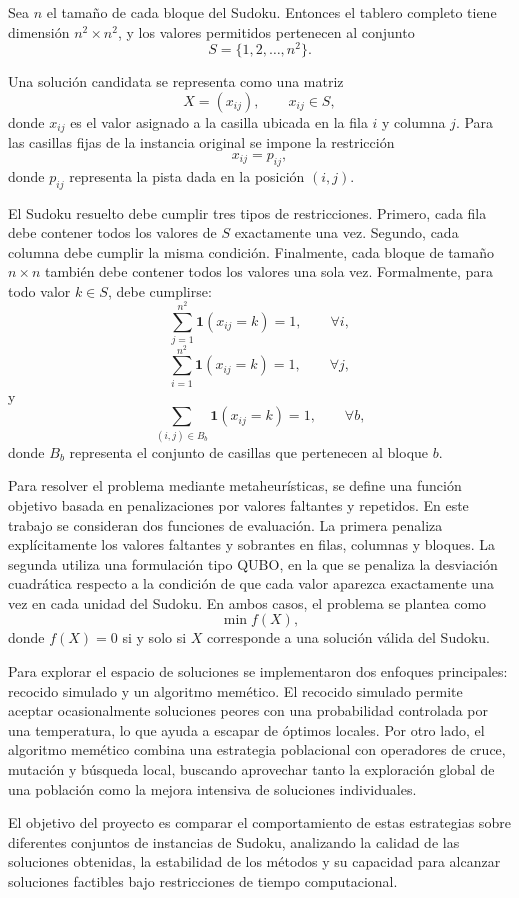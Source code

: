 \documentclass{article}
\begin{document}
Sea \(n\) el tamaño de cada bloque del Sudoku. Entonces el tablero completo tiene dimensión \(n^2 \times n^2\), y los valores permitidos pertenecen al conjunto
\[
S = \{1,2,\ldots,n^2\}.
\]

Una solución candidata se representa como una matriz
\[
X = (x_{ij}), \qquad x_{ij} \in S,
\]
donde \(x_{ij}\) es el valor asignado a la casilla ubicada en la fila \(i\) y columna \(j\). Para las casillas fijas de la instancia original se impone la restricción
\[
x_{ij} = p_{ij},
\]
donde \(p_{ij}\) representa la pista dada en la posición \((i,j)\).

El Sudoku resuelto debe cumplir tres tipos de restricciones. Primero, cada fila debe contener todos los valores de \(S\) exactamente una vez. Segundo, cada columna debe cumplir la misma condición. Finalmente, cada bloque de tamaño \(n \times n\) también debe contener todos los valores una sola vez. Formalmente, para todo valor \(k \in S\), debe cumplirse:
\[
\sum_{j=1}^{n^2} \mathbf{1}(x_{ij}=k) = 1, \qquad \forall i,
\]
\[
\sum_{i=1}^{n^2} \mathbf{1}(x_{ij}=k) = 1, \qquad \forall j,
\]
y
\[
\sum_{(i,j)\in B_b} \mathbf{1}(x_{ij}=k) = 1, \qquad \forall b,
\]
donde \(B_b\) representa el conjunto de casillas que pertenecen al bloque \(b\).

Para resolver el problema mediante metaheurísticas, se define una función objetivo basada en penalizaciones por valores faltantes y repetidos. En este trabajo se consideran dos funciones de evaluación. La primera penaliza explícitamente los valores faltantes y sobrantes en filas, columnas y bloques. La segunda utiliza una formulación tipo QUBO, en la que se penaliza la desviación cuadrática respecto a la condición de que cada valor aparezca exactamente una vez en cada unidad del Sudoku. En ambos casos, el problema se plantea como
\[
\min f(X),
\]
donde \(f(X)=0\) si y solo si \(X\) corresponde a una solución válida del Sudoku.

Para explorar el espacio de soluciones se implementaron dos enfoques principales: recocido simulado y un algoritmo memético. El recocido simulado permite aceptar ocasionalmente soluciones peores con una probabilidad controlada por una temperatura, lo que ayuda a escapar de óptimos locales. Por otro lado, el algoritmo memético combina una estrategia poblacional con operadores de cruce, mutación y búsqueda local, buscando aprovechar tanto la exploración global de una población como la mejora intensiva de soluciones individuales.

El objetivo del proyecto es comparar el comportamiento de estas estrategias sobre diferentes conjuntos de instancias de Sudoku, analizando la calidad de las soluciones obtenidas, la estabilidad de los métodos y su capacidad para alcanzar soluciones factibles bajo restricciones de tiempo computacional.\\
\uline{\hfill \phantom{-} \hfill}
\end{document}
